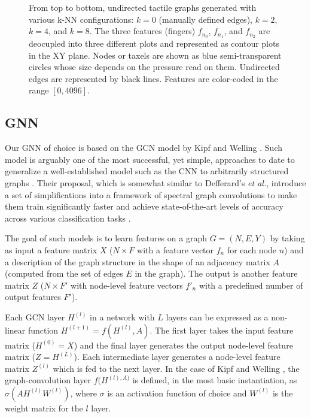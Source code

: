 \begin{figure}[!htb]
	\caption{From top to bottom, undirected tactile graphs generated with various \ac{k-NN} configurations: $k=0$ (manually defined edges), $k=2$, $k=4$, and $k=8$. The three features (fingers) $f_{n_0}$, $f_{n_1}$, and $f_{n_2}$ are deocupled into three different plots and represented as contour plots in the XY plane. Nodes or taxels are shown as blue semi-transparent circles whose size depends on the pressure read on them. Undirected edges are represented by black lines. Features are color-coded in the range $[0, 4096]$.}
	\label{fig:sample_graphs}
\end{figure}

\subsection{\acl{GNN}}
\label{cha:tactile:sec:tactilegcn:subsec:gnn}

Our \acf{GNN} of choice is based on the \ac{GCN} model by Kipf and Welling \cite{Kipf2016}. Such model is arguably one of the most successful, yet simple, approaches to date to generalize a well-established model such as the \ac{CNN} to arbitrarily structured graphs \cite{Bronstein2017}\cite{Schlichtkrull2018}. Their proposal, which is somewhat similar to Defferard's \emph{et al.}, introduce a set of simplifications into a framework of spectral graph convolutions to make them train significantly faster and achieve state-of-the-art levels of accuracy across various classification tasks \cite{Defferrard2016}.

The goal of such models is to learn features on a graph $G = (N, E, Y)$ by taking as input a feature matrix $X$ ($N \times F$ with a feature vector $f_n$ for each node $n$) and a description of the graph structure in the shape of an adjacency matrix $A$ (computed from the set of edges $E$ in the graph). The output is another feature matrix $Z$ ($N \times F'$ with node-level feature vectors $f'_n$ with a predefined number of output features $F'$).

Each \ac{GCN} layer $H^(l)$ in a network with $L$ layers can be expressed as a non-linear function $H^{(l+1)} = f(H^{(l)}, A)$. The first layer takes the input feature matrix ($H^{(0)} = X$) and the final layer generates the output node-level feature matrix ($Z = H^{(L)}$). Each intermediate layer generates a node-level feature matrix $Z^{(l)}$ which is fed to the next layer. In the case of Kipf and Welling \cite{Kipf2016}, the graph-convolution layer $f(H^{(l), A)}$ is defined, in the most basic instantiation, as $\sigma(AH^{(l)}W^{(l)})$, where $\sigma$ is an activation function of choice and $W^{(l)}$ is the weight matrix for the $l$ layer.

